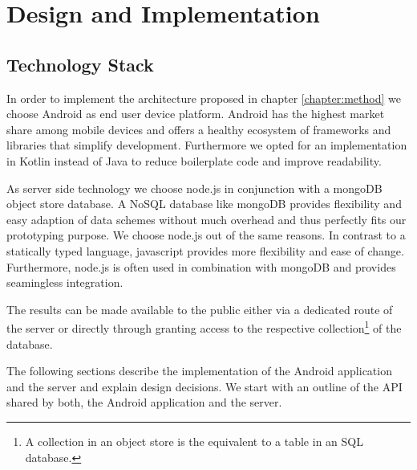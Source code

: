 \chapter{Design and Implementation}\label{chapter:design}

\section{Technology Stack}
In order to implement the architecture proposed in chapter \ref{chapter:method} we choose Android as end user device platform. Android has the highest market share \cite{android-market-share} among mobile devices and offers a healthy ecosystem of frameworks and libraries that simplify development. Furthermore we opted for an implementation in Kotlin instead of Java to reduce boilerplate code and improve readability.

As server side technology we choose node.js in conjunction with a mongoDB object store database. A NoSQL database like mongoDB provides flexibility and easy adaption of data schemes without much overhead and thus perfectly fits our prototyping purpose. We choose node.js out of the same reasons. In contrast to a statically typed language, javascript provides more flexibility and ease of change. Furthermore, node.js is often used in combination with mongoDB and provides seamingless integration.

The results can be made available to the public either via a dedicated route of the server or directly through granting access to the respective collection\footnote{A collection in an object store is the equivalent to a table in an SQL database.} of the database.

The following sections describe the implementation of the Android application and the server and explain design decisions. We start with an outline of the API shared by both, the Android application and the server.\\

